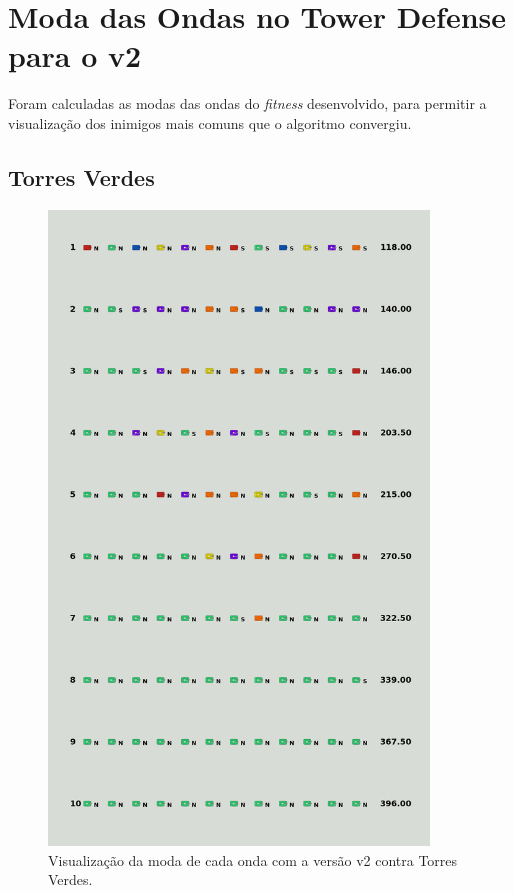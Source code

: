 \chapter{Moda das Ondas no Tower Defense para o v2}
\label{sec:apend-moda-td-v2}

Foram calculadas as modas das ondas do \textit{fitness} desenvolvido, para permitir a visualização dos inimigos mais comuns que o algoritmo convergiu.

\section{Torres Verdes}
\label{sec:apend-moda-td-g-v2}

\begin{figure}[H]
  \centering
  \includegraphics[width=0.9\textwidth]{figuras/td/td_allgreen_ai_mode_2_1.png}
  \caption{Visualização da moda de cada onda com a versão v2 contra Torres Verdes.}
  \label{fig:td-moda-green-2-1}
\end{figure}

